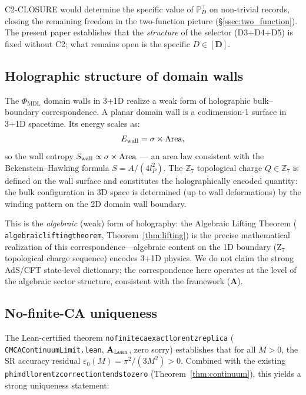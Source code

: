 \documentclass[11pt]{article}
\theoremstyle{remark}
\newcommand{\PHIMDL}{\Phi_{\mathrm{MDL}}}
\newcommand{\ZS}{\mathbb{Z}_7}
\newcommand{\lean}[1]{%
  \penalty-100
  \begingroup\def\_{\textunderscore\allowbreak}\texttt{#1}\endgroup}
\newcommand{\epsz}{\varepsilon_0}
\newcommand{\CatA}{\textbf{A}}
\newcommand{\CatAL}{\ensuremath{\textbf{A}_{\rm Lean}}}
\begin{document}
C2-CLOSURE would determine the specific value of $\mathbb{P}^\top_D$ on
non-trivial records, closing the remaining freedom in the two-function
picture (\S\ref{ssec:two_function}).  The present paper establishes that
the \emph{structure} of the selector (D3+D4+D5) is fixed without C2;
what remains open is the specific $D\in[\mathbf{D}]$.

\subsection{Holographic structure of domain walls}
\label{ssec:holographic}

The $\PHIMDL$ domain walls in 3+1D realize a weak form of holographic
bulk--boundary correspondence.  A planar domain wall is a codimension-1
surface in 3+1D spacetime.  Its energy scales as:
\begin{equation}
  E_{\rm wall} = \sigma \times \mathrm{Area},
\end{equation}
so the wall entropy $S_{\rm wall} \propto \sigma \times \mathrm{Area}$
--- an area law consistent with the Bekenstein--Hawking formula
$S = A/(4l_P^2)$.  The $\ZS$ topological charge $Q\in\ZS$ is defined on
the wall surface and constitutes the holographically encoded quantity: the
bulk configuration in 3D space is determined (up to wall deformations) by
the winding pattern on the 2D domain wall boundary.

This is the \emph{algebraic} (weak) form of holography: the Algebraic
Lifting Theorem (\lean{algebraic\_lifting\_theorem},
Theorem~\ref{thm:lifting}) is the precise mathematical realization of
this correspondence---algebraic content on the 1D boundary (Z$_7$
topological charge sequence) encodes 3+1D physics.  We do not claim the
strong AdS/CFT state-level dictionary; the correspondence here operates at
the level of the algebraic sector structure, consistent with the framework
($\CatA$).

\subsection{No-finite-CA uniqueness}
\label{ssec:no_ca_replica}

The Lean-certified theorem \lean{no\_finite\_ca\_exact\_lorentz\_replica}
(\lean{CMCAContinuumLimit.lean}, $\CatAL$, zero sorry) establishes that for all
$M>0$, the SR accuracy residual $\epsz(M) = \pi^2/(3M^2) > 0$.  Combined with
the existing \lean{phimdl\_lorentz\_correction\_tendsto\_zero}
(Theorem~\ref{thm:continuum}), this yields a strong uniqueness statement:
\end{document}
